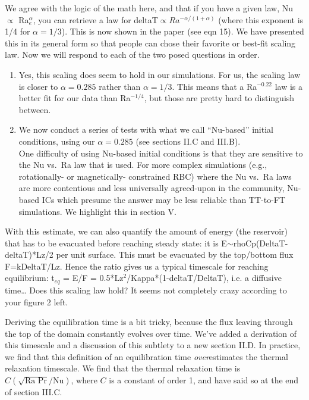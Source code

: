 \documentclass[aps, 11pt, singlecolumn]{revtex4-1} %
\begin{document}
\begin{singlespace}
\begin{myquotation}
\begin{itemize}
\begin{itemize}
\end{itemize}
\end{itemize}
\end{myquotation}
We agree with the logic of the math here, and that if you have a given law, Nu $\propto$ Ra$_e^{\alpha}$, you can retrieve a law for deltaT$\propto Ra^{-\alpha/(1+\alpha)}$ (where this exponent is 1/4 for $\alpha = 1/3$).
This is now shown in the paper (see eqn 15).
We have presented this in its general form so that people can chose their favorite or best-fit scaling law.
Now we will respond to each of the two posed questions in order.
\begin{enumerate}
\item 
Yes, this scaling does seem to hold in our simulations.
For us, the scaling law is closer to $\alpha = 0.285$ rather than $\alpha = 1/3$.
This means that a Ra$^{-0.22}$ law is a better fit for our data than Ra$^{-1/4}$, but those are pretty hard to distinguish between.
\item 
We now conduct a series of tests with what we call ``Nu-based'' initial conditions, using our $\alpha = 0.285$ (see sections II.C and III.B).
\vspace{0.5cm}
\\
One difficulty of using Nu-based initial conditions is that they are sensitive to the Nu vs.~Ra law that is used.
For more complex simulations (e.g., rotationally- or magnetically- constrained RBC) where the Nu vs.~Ra laws are more contentious and less universally agreed-upon in the community, Nu-based ICs which presume the answer may be less reliable than TT-to-FT simulations.
We highlight this in section V.
\end{enumerate}


\begin{myquotation}
With this estimate, we can also quantify the amount of energy (the reservoir) that has to be evacuated before reaching steady state: it is E$\sim$rhoCp(DeltaT-deltaT)*Lz/2 per unit surface. 
This must be evacuated by the top/bottom flux F=kDeltaT/Lz. 
Hence the ratio gives us a typical timescale for reaching equilibrium: t$_{eq}$ = E/F = 0.5*Lz$^2$/Kappa*(1-deltaT/DeltaT), i.e. a diffusive time…
Does this scaling law hold? It seems not completely crazy according to your figure 2 left.
\end{myquotation}
Deriving the equilibration time is a bit tricky, because the flux leaving through the top of the domain constantly evolves over time.
We've added a derivation of this timescale and a discussion of this subtlety to a new section II.D.
In practice, we find that this definition of an equilibration time \emph{over}estimates the thermal relaxation timescale.
We find that the thermal relaxation time is $C (\sqrt{\text{Ra Pr}}/\text{Nu})$, where $C$ is a constant of order 1, and have said so at the end of section III.C.


\end{singlespace}
\end{document}
